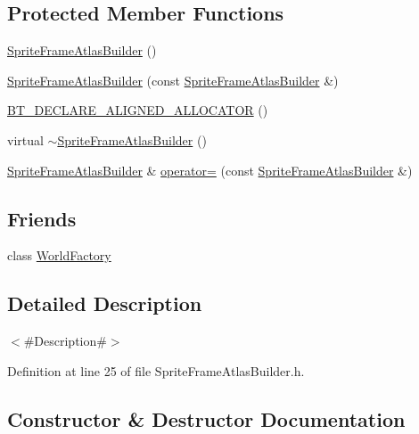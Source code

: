 \subsection*{Protected Member Functions}
\begin{DoxyCompactItemize}
\item 
\mbox{\hyperlink{classnjli_1_1_sprite_frame_atlas_builder_abec86e9a21df3c99e6377874d7c1e191}{Sprite\+Frame\+Atlas\+Builder}} ()
\item 
\mbox{\hyperlink{classnjli_1_1_sprite_frame_atlas_builder_ae2fe8b7db6cf2781d147fee0a88ef81d}{Sprite\+Frame\+Atlas\+Builder}} (const \mbox{\hyperlink{classnjli_1_1_sprite_frame_atlas_builder}{Sprite\+Frame\+Atlas\+Builder}} \&)
\item 
\mbox{\hyperlink{classnjli_1_1_sprite_frame_atlas_builder_a71d987eef7b62ec6e6e92a6557412d6f}{B\+T\+\_\+\+D\+E\+C\+L\+A\+R\+E\+\_\+\+A\+L\+I\+G\+N\+E\+D\+\_\+\+A\+L\+L\+O\+C\+A\+T\+OR}} ()
\item 
virtual \mbox{\hyperlink{classnjli_1_1_sprite_frame_atlas_builder_aab2e26cb12c81c82a7e43c5d12815b52}{$\sim$\+Sprite\+Frame\+Atlas\+Builder}} ()
\item 
\mbox{\hyperlink{classnjli_1_1_sprite_frame_atlas_builder}{Sprite\+Frame\+Atlas\+Builder}} \& \mbox{\hyperlink{classnjli_1_1_sprite_frame_atlas_builder_a7ede2fb5ac211101e11c848c5ccacc19}{operator=}} (const \mbox{\hyperlink{classnjli_1_1_sprite_frame_atlas_builder}{Sprite\+Frame\+Atlas\+Builder}} \&)
\end{DoxyCompactItemize}
\subsection*{Friends}
\begin{DoxyCompactItemize}
\item 
class \mbox{\hyperlink{classnjli_1_1_sprite_frame_atlas_builder_acb96ebb09abe8f2a37a915a842babfac}{World\+Factory}}
\end{DoxyCompactItemize}


\subsection{Detailed Description}
$<$\#\+Description\#$>$ 

Definition at line 25 of file Sprite\+Frame\+Atlas\+Builder.\+h.



\subsection{Constructor \& Destructor Documentation}
\mbox{\label{classnjli_1_1_sprite_frame_atlas_builder_abec86e9a21df3c99e6377874d7c1e191}} 
